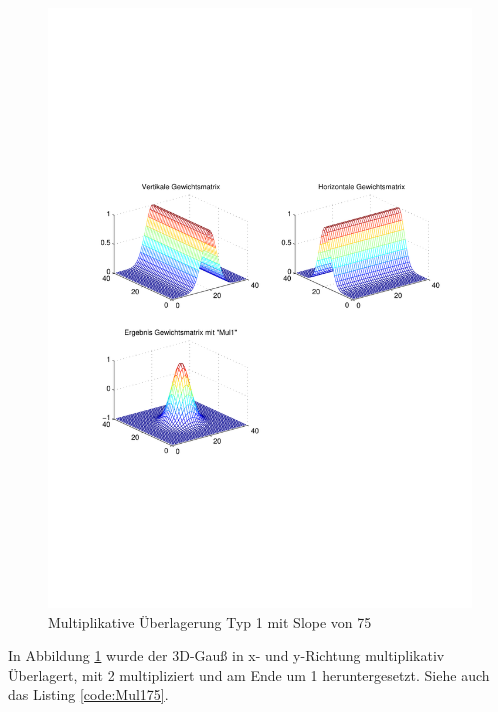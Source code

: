 \newpage
\begin{figure}[hbt]
	\centering
	\includegraphics[width=1\linewidth]{./Bilder/Auswertung/GewichtmatrixEinzelschritte/Endergebnis_Gewichtsmatrix_Slope_75_Type_Mul1}
	\caption{Multiplikative Überlagerung Typ 1 mit Slope von 75}
	\label{Mul175}
\end{figure}



In Abbildung \ref{Mul175} wurde der 3D-Gauß in x- und y-Richtung multiplikativ Überlagert, mit 2 multipliziert und am Ende um 1 heruntergesetzt. Siehe auch das Listing \ref{code:Mul175}.

